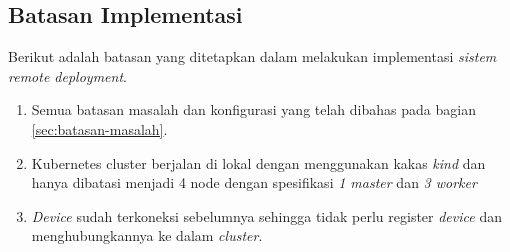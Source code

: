 \subsection{Batasan Implementasi}
Berikut adalah batasan yang ditetapkan dalam melakukan implementasi \textit{sistem remote deployment}.

\begin{enumerate}
  \item Semua batasan masalah dan konfigurasi yang telah dibahas pada bagian \ref{sec:batasan-masalah}.
  \item Kubernetes cluster berjalan di lokal dengan menggunakan kakas \textit{kind} dan hanya dibatasi menjadi 4 node dengan spesifikasi \textit{1 master} dan \textit{3 worker}
  \item \textit{Device} sudah terkoneksi sebelumnya sehingga tidak perlu register \textit{device} dan menghubungkannya ke dalam \textit{cluster}.
\end{enumerate}